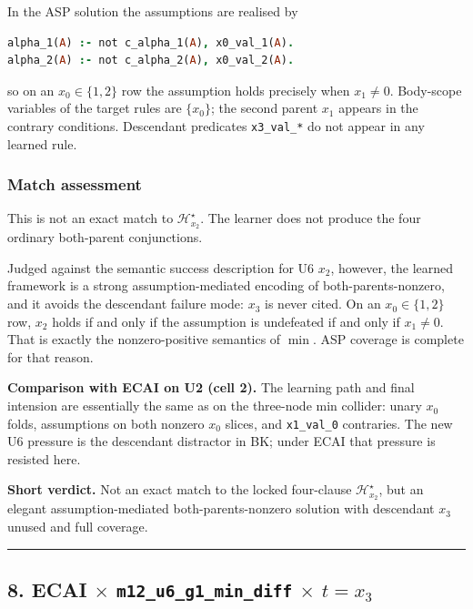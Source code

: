 \documentclass[11pt]{article}
\begin{document}
In the ASP solution the assumptions are realised by

\begin{lstlisting}[style=logic,language=Prolog]
alpha_1(A) :- not c_alpha_1(A), x0_val_1(A).
alpha_2(A) :- not c_alpha_2(A), x0_val_2(A).
\end{lstlisting}

so on an \(x_0\in\{1,2\}\) row the assumption holds precisely when \(x_1\neq 0\). Body-scope variables of the target rules are \(\{x_0\}\); the second parent \(x_1\) appears in the contrary conditions. Descendant predicates \texttt{x3\_val\_*} do not appear in any learned rule.

\subsubsection{Match assessment}

This is not an exact match to \(\mathcal{H}_{x_2}^\star\). The learner does not produce the four ordinary both-parent conjunctions.

Judged against the semantic success description for U6 \(x_2\), however, the learned framework is a strong assumption-mediated encoding of both-parents-nonzero, and it avoids the descendant failure mode: \(x_3\) is never cited. On an \(x_0\in\{1,2\}\) row, \(x_2\) holds if and only if the assumption is undefeated if and only if \(x_1\neq 0\). That is exactly the nonzero-positive semantics of \(\min\). ASP coverage is complete for that reason.

\textbf{Comparison with ECAI on U2 (cell 2).} The learning path and final intension are essentially the same as on the three-node min collider: unary \(x_0\) folds, assumptions on both nonzero \(x_0\) slices, and \texttt{x1\_val\_0} contraries. The new U6 pressure is the descendant distractor in BK; under ECAI that pressure is resisted here.

\textbf{Short verdict.} Not an exact match to the locked four-clause \(\mathcal{H}_{x_2}^\star\), but an elegant assumption-mediated both-parents-nonzero solution with descendant \(x_3\) unused and full coverage.

\medskip\hrule\medskip

\subsection{\texorpdfstring{8. ECAI \(\times\) \texttt{m12\_u6\_g1\_min\_diff} \(\times\) \(t=x_3\)}{8. ECAI - m12-u6-g1-min-diff - target x3}}
\end{document}
